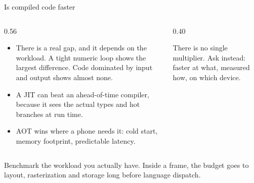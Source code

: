 \documentclass[10pt,aspectratio=169,t]{beamer}
\begin{document}
\begin{frame}[eyebrow=How code runs]{Is compiled code faster}
  \vskip 2mm
  \begin{columns}[T]
    \begin{column}{0.56\textwidth}
      \begin{itemize}
        \item There is a real gap, and it depends on the workload. A tight numeric loop shows the largest difference. Code dominated by input and output shows almost none.
        \item A JIT can beat an ahead-of-time compiler, because it sees the actual types and hot branches at run time.
        \item AOT wins where a phone needs it: cold start, memory footprint, predictable latency.
      \end{itemize}
    \end{column}
    \begin{column}{0.40\textwidth}
      \begin{warning}
         There is no single multiplier. Ask instead: faster at what, measured how, on which device.
      \end{warning}
    \end{column}
  \end{columns}
  \begin{takeaway}{Benchmark the workload you actually have.}
    Inside a frame, the budget goes to layout, rasterization and storage long before language dispatch.
  \end{takeaway}
\end{frame}
\end{document}
